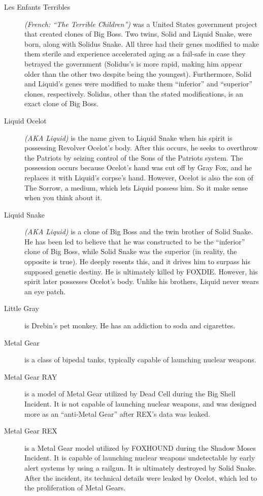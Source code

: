 \documentclass[12pt]{article}
\begin{document}
\begin{description}
	\item [Les Enfants Terribles] \textit{(French: ``The Terrible
		Children'')} was a United States government project that
		created clones of Big Boss. Two twins, Solid and Liquid Snake,
		were born, along with Solidus Snake. All three had their genes
		modified to make them sterile and experience accelerated aging
		as a fail-safe in case they betrayed the government (Solidus's
		is more rapid, making him appear older than the other two
		despite being the youngest). Furthermore, Solid and Liquid's
		genes were modified to make them ``inferior'' and ``superior''
		clones, respectively. Solidus, other than the stated
		modifications, is an exact clone of Big Boss.

	\item [Liquid Ocelot] \textit{(AKA Liquid)} is the name given to Liquid
		Snake when his spirit is possessing Revolver Ocelot's body.
		After this occurs, he seeks to overthrow the Patriots by
		seizing control of the Sons of the Patriots system. The
		possession occurs because Ocelot's hand was cut off by Gray
		Fox, and he replaces it with Liquid's corpse's hand. However,
		Ocelot is also the son of The Sorrow, a medium, which lets
		Liquid possess him. So it make sense when you think about it.

	\item [Liquid Snake] \textit{(AKA Liquid)} is a clone of Big Boss and
		the twin brother of Solid Snake. He has been led to believe
		that he was constructed to be the ``inferior'' clone of Big
		Boss, while Solid Snake was the superior (in reality, the
		opposite is true). He deeply resents this, and it drives him to
		surpass his supposed genetic destiny. He is ultimately killed
		by FOXDIE. However, his spirit later possesses Ocelot's body.
		Unlike his brothers, Liquid never wears an eye patch.

	\item [Little Gray] is Drebin's pet monkey. He has an addiction to soda
		and cigarettes.

	\item [Metal Gear] is a class of bipedal tanks, typically capable of
		launching nuclear weapons.

	\item [Metal Gear RAY] is a model of Metal Gear utilized by Dead Cell
		during the Big Shell Incident. It is not capable of launching
		nuclear weapons, and was designed more as an ``anti-Metal
		Gear'' after REX's data was leaked.

	\item [Metal Gear REX] is a Metal Gear model utilized by FOXHOUND
		during the Shadow Moses Incident. It is capable of launching
		nuclear weapons undetectable by early alert systems by using a
		railgun. It is ultimately destroyed by Solid Snake. After the
		incident, its technical details were leaked by Ocelot, which
		led to the proliferation of Metal Gears.


\end{description}
\end{document}
